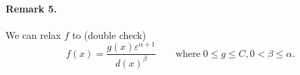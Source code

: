 \documentclass[10pt]{article}
\theoremstyle{plain}
\theoremstyle{remark}
\begin{document}
\paragraph{Remark 5.} We can relax $f$ to (double check)
\begin{equation*}
    f(x) = \frac{g(x)\varepsilon^{\alpha+1}}{d(x)^\beta} \qquad\text{where}\;0\leq g\leq C, 0<\beta \leq \alpha.
\end{equation*}







%
%
\end{document}
